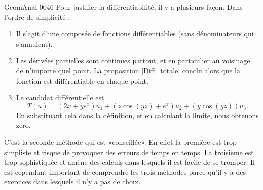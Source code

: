\begin{corrige}{GeomAnal-0046}
        Pour justifier la différentiabilité, il y a plusieurs façon. Dans l'ordre de simplicité :
        \begin{enumerate}
            \item
                Il s'agit d'une composée de fonctions différentiables (sans dénominateurs qui s'annulent).
            \item
                Les dérivées partielles sont continues partout, et en particulier au voisinage de n'importe quel point. La proposition \ref{Diff_totale} conclu alors que la fonction est différentiable en chaque point.
            \item
                Le candidat différentielle est
                \begin{equation}
                    T(u)=(2x+ye^x)u_1+(z\cos(yz)+e^x)u_2+(y\cos(yz))u_3.
                \end{equation}
                En substituant cela dans la définition, et en calculant la limite, nous obtenons zéro.
        \end{enumerate}
        C'est la seconde méthode qui est «conseillée». En effet la première est trop simpliste et risque de provoquer des erreurs de temps en temps. La troisième est trop sophistiquée et amène des calculs dans lesquels il est facile de se tromper. Il est cependant important de comprendre les trois méthodes parce qu'il y a des exercices dans lesquels il n'y a pas de choix.
\end{corrige}
